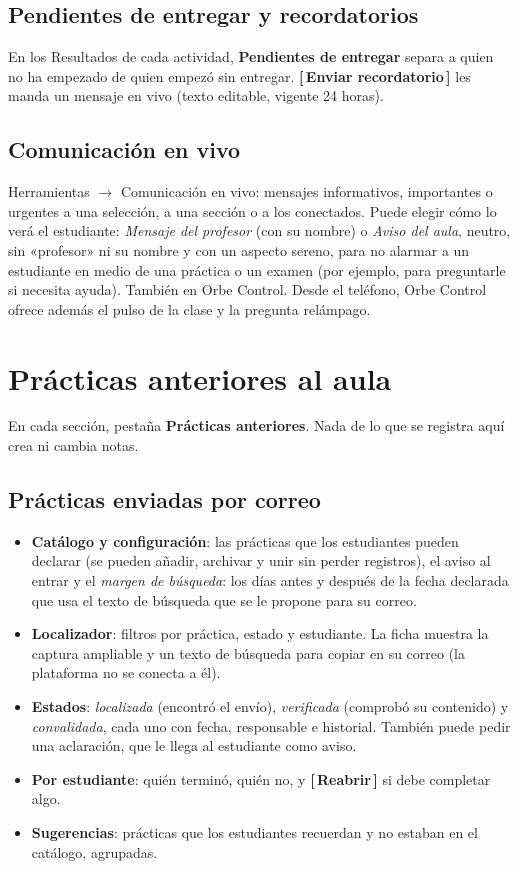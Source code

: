 \documentclass[11pt,a4paper,oneside]{book}
\newcommand{\boton}[1]{\textsf{\textbf{[\,#1\,]}}}
\newcommand{\menu}[1]{\textsf{\textbf{#1}}}
\newcommand{\ruta}[1]{\textsf{#1}}
\begin{document}
\section{Pendientes de entregar y recordatorios}
En los Resultados de cada actividad, \textbf{Pendientes de entregar} separa a quien no ha empezado de quien empezó sin
entregar. \boton{Enviar recordatorio} les manda un mensaje en vivo (texto editable, vigente 24 horas).

\section{Comunicación en vivo}
\ruta{Herramientas $\rightarrow$ Comunicación en vivo}: mensajes informativos, importantes o urgentes a una selección,
a una sección o a los conectados. Puede elegir cómo lo verá el estudiante: \emph{Mensaje del profesor} (con su nombre)
o \emph{Aviso del aula}, neutro, sin «profesor» ni su nombre y con un aspecto sereno, para no alarmar a un estudiante en
medio de una práctica o un examen (por ejemplo, para preguntarle si necesita ayuda). También en Orbe Control. Desde el teléfono, Orbe Control ofrece además el pulso de la clase y la pregunta
relámpago.

\chapter{Prácticas anteriores al aula}
En cada sección, pestaña \menu{Prácticas anteriores}. Nada de lo que se registra aquí crea ni cambia notas.

\section{Prácticas enviadas por correo}
\begin{itemize}
  \item \textbf{Catálogo y configuración}: las prácticas que los estudiantes pueden declarar (se pueden añadir, archivar
        y unir sin perder registros), el aviso al entrar y el \emph{margen de búsqueda}: los días antes y después de la
        fecha declarada que usa el texto de búsqueda que se le propone para su correo.
  \item \textbf{Localizador}: filtros por práctica, estado y estudiante. La ficha muestra la captura ampliable y un
        texto de búsqueda para copiar en su correo (la plataforma no se conecta a él).
  \item \textbf{Estados}: \emph{localizada} (encontró el envío), \emph{verificada} (comprobó su contenido) y
        \emph{convalidada}, cada uno con fecha, responsable e historial. También puede pedir una aclaración, que le llega
        al estudiante como aviso.
  \item \textbf{Por estudiante}: quién terminó, quién no, y \boton{Reabrir} si debe completar algo.
  \item \textbf{Sugerencias}: prácticas que los estudiantes recuerdan y no estaban en el catálogo, agrupadas.
\end{itemize}
\end{document}
